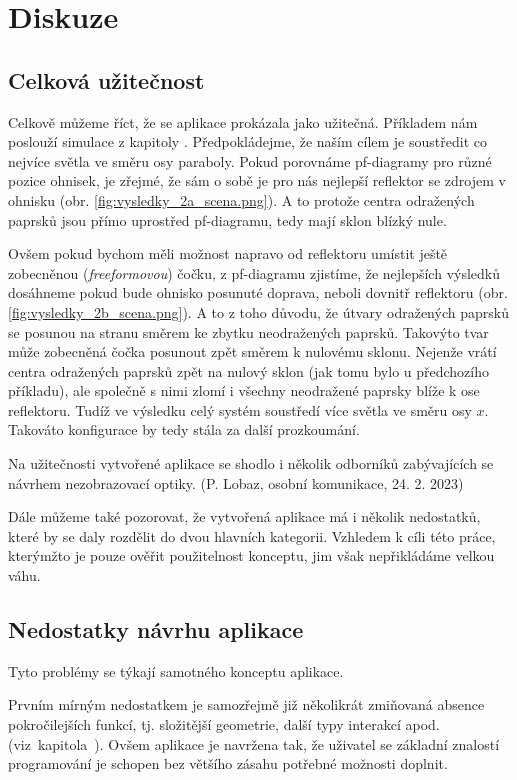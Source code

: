 \chapter{Diskuze}

\section{Celková užitečnost}

Celkově můžeme říct, že se aplikace prokázala jako užitečná. Příkladem nám poslouží simulace z kapitoly . Předpokládejme, že naším cílem je soustředit co nejvíce světla ve směru osy paraboly. Pokud porovnáme pf-diagramy pro různé pozice ohnisek, je zřejmé, že sám o sobě je pro nás nejlepší reflektor se zdrojem v ohnisku (obr. \ref{fig:vysledky_2a_scena.png}). A to protože centra odražených paprsků jsou přímo uprostřed pf-diagramu, tedy mají sklon blízký nule.

Ovšem pokud bychom měli možnost napravo od reflektoru umístit ještě zobecněnou (\emph{freeformovou}) čočku, z pf-diagramu zjistíme, že nejlepších výsledků dosáhneme pokud bude ohnisko posunuté doprava, neboli dovnitř reflektoru (obr. \ref{fig:vysledky_2b_scena.png}). A to z toho důvodu, že útvary odražených paprsků se posunou na stranu směrem ke zbytku neodražených paprsků. Takovýto tvar může zobecněná čočka posunout zpět směrem k nulovému sklonu. Nejenže vrátí centra odražených paprsků zpět na nulový sklon (jak tomu bylo u předchozího příkladu), ale společně s nimi zlomí i všechny neodražené paprsky blíže k ose reflektoru. Tudíž ve výsledku celý systém soustředí více světla ve směru osy $x$. Takováto konfigurace by tedy stála za další prozkoumání.

Na užitečnosti vytvořené aplikace se shodlo i několik odborníků zabývajících se návrhem nezobrazovací optiky. (P. Lobaz, osobní komunikace, 24. 2. 2023)

Dále můžeme také pozorovat, že vytvořená aplikace má i několik nedostatků, které by se daly rozdělit do dvou hlavních kategorii. Vzhledem k cíli této práce, kterýmžto je pouze ověřit použitelnost konceptu, jim však nepřikládáme velkou váhu.

\section{Nedostatky návrhu aplikace}

Tyto problémy se týkají samotného konceptu aplikace.

Prvním mírným nedostatkem je samozřejmě již několikrát zmiňovaná absence pokročilejších funkcí, tj. složitější geometrie, další typy interakcí apod. (viz~kapitola~). Ovšem aplikace je navržena tak, že uživatel se základní znalostí programování je schopen bez většího zásahu potřebné možnosti doplnit.


